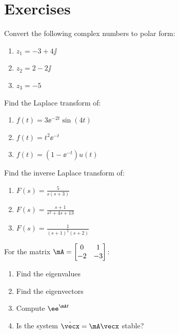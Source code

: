 \chapter{Exercises}
\label{ch:math_exercises}

\begin{exercise}
Convert the following complex numbers to polar form:
\begin{enumerate}[label=(\alph*)]
    \item $z_1 = -3 + 4\jj$
    \item $z_2 = 2 - 2\jj$
    \item $z_3 = -5$
\end{enumerate}
\end{exercise}

\begin{exercise}
Find the Laplace transform of:
\begin{enumerate}[label=(\alph*)]
    \item $f(t) = 3\ee^{-2t}\sin(4t)$
    \item $f(t) = t^2\ee^{-t}$
    \item $f(t) = (1 - \ee^{-t})u(t)$
\end{enumerate}
\end{exercise}

\begin{exercise}
Find the inverse Laplace transform of:
\begin{enumerate}[label=(\alph*)]
    \item $F(s) = \frac{5}{s(s+3)}$
    \item $F(s) = \frac{s+1}{s^2+4s+13}$
    \item $F(s) = \frac{1}{(s+1)^2(s+2)}$
\end{enumerate}
\end{exercise}

\begin{exercise}
For the matrix $\mA = \begin{bmatrix} 0 & 1 \\ -2 & -3 \end{bmatrix}$:
\begin{enumerate}[label=(\alph*)]
    \item Find the eigenvalues
    \item Find the eigenvectors
    \item Compute $\ee^{\mA t}$
    \item Is the system $\dot{\vecx} = \mA\vecx$ stable?
\end{enumerate}
\end{exercise}

